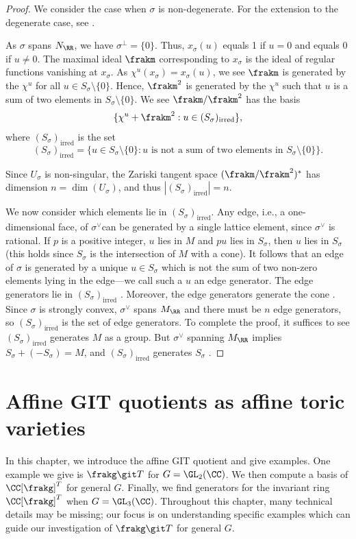 \documentclass[12pt]{amsart}
\theoremstyle{plain}
\begin{document}
\begin{proof}
We consider the case when $\sigma$ is non-degenerate. For the extension to the degenerate case, see \cite[\S 2.1]{Fulton93}.

As $\sigma$ spans $N_\RR$, we have $\sigma^\perp = \{0\}$.
Thus, $x_\sigma(u)$ equals 1 if $u=0$ and equals 0 if $u \ne 0$.
The maximal ideal $\frakm$ corresponding to $x_\sigma$ is the ideal of regular functions vanishing at $x_\sigma$.
As $\chi^u(x_\sigma) = x_\sigma(u)$, we see $\frakm$ is generated by the $\chi^u$ for all $u \in S_\sigma \setminus \{0\}$.
Hence, $\frakm^2$ is generated by the $\chi^u$ such that $u$ is a sum of two elements in $S_\sigma \setminus \{0\}$.
We see $\frakm / \frakm^2$ has the basis 
$$\{\chi^u + \frakm^2 : u \in (S_\sigma)_{\text{irred}}\},$$
where $(S_\sigma)_{\text{irred}}$ is the set
$$(S_\sigma)_{\text{irred}} = \{u \in S_\sigma \setminus \{0\} : u \text{ is not a sum of two elements in } S_\sigma\setminus\{0\}\}.$$

Since $U_\sigma$ is non-singular, the Zariski tangent space $(\frakm/\frakm^2)^*$ has dimension $n = \dim(U_\sigma)$, and thus $|(S_\sigma)_{\text{irred}}| = n$.

We now consider which elements lie in $(S_\sigma)_{\text{irred}}$.
Any edge, i.e., a one-dimensional face, of $\sigma^\vee$can be generated by a single lattice element, since $\sigma^\vee$ is rational.
If $p$ is a positive integer, $u$ lies in $M$ and $p u$ lies in $S_\sigma$, then $u$ lies in $S_\sigma$ (this holds since $S_\sigma$ is the intersection of $M$ with a cone).
It follows that an edge of $\sigma$ is generated by a unique $u \in S_\sigma$ which is not the sum of two non-zero elements lying in the edge---we call such a $u$ an edge generator.
The edge generators lie in $(S_\sigma)_{\text{irred}}$ \cite[Proposition 1.2.23]{CLS11}.
Moreover, the edge generators generate the cone \cite[Lemma 1.2.15]{CLS11}.
Since $\sigma$ is strongly convex, $\sigma^\vee$ spans $M_\RR$ and there must be $n$ edge generators, so $(S_\sigma)_{\text{irred}}$ is the set of edge generators.
To complete the proof, it suffices to see $(S_\sigma)_{\text{irred}}$ generates $M$ as a group.
But $\sigma^\vee$ spanning $M_\RR$ implies $S_\sigma + (-S_\sigma) = M$, and $(S_\sigma)_{\text{irred}}$ generates $S_\sigma$ \cite[Proposition 1.2.23]{CLS11}.
\end{proof}






\newpage
{}
\section{Affine GIT quotients as affine toric varieties}
In this chapter, we introduce the affine GIT quotient and give examples.
One example we give is $\frakg \git T$ for $G = \GL_2(\CC)$.
We then compute a basis of $\CC[\frakg]^T$ for general $G$.
Finally, we find generators for the invariant ring $\CC[\frakg]^T$ when $G = \GL_3(\CC)$.
Throughout this chapter, many technical details may be missing;
our focus is on understanding specific examples which can guide our investigation of $\frakg \git T$ for general $G$.
\end{document}

